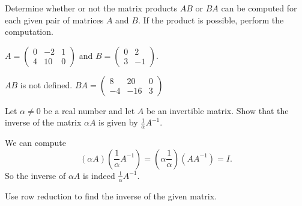 \documentclass{article}
\begin{document}



\problemlabel

\noindent Determine whether or  not the matrix products $AB$ or $BA$ can be computed for each given pair of  matrices $A$ and $B$.  If the product is possible, perform the computation.

\begin{exercise}  \label{c4.6.-1b}
$A=\left(\begin{array}{rrr} 0 & -2 & 1\\ 4 & 10 & 0 \end{array}\right)$
and $B=\left(\begin{array}{rr} 0 & 2 \\ 3 & -1 \end{array}\right)$.

\begin{solution}
$AB$ is not defined. $BA=\left(\begin{array}{rrr} 8 &  20 &  0\\
 -4 & -16  &  3\end{array}\right)$


\end{solution}
\end{exercise}





\problemlabel

\begin{exercise} \label{c4.8.2}
Let $\alpha \not=0$ be a real number and let $A$ be an invertible
matrix.  Show that the inverse of the matrix $\alpha A$ is given by
$\frac{1}{\alpha}A^{-1}$.

\begin{solution}

We can compute
\[ (\alpha A)\left(\frac{1}{\alpha}A^{-1}\right) =
\left(\alpha\frac{1}{\alpha}\right)(AA^{-1}) = I. \]
So the inverse of $\alpha A$ is indeed $\frac{1}{\alpha}A^{-1}$.

\end{solution}
\end{exercise}





\problemlabel

\noindent Use row reduction to find the inverse of the given matrix.
\end{document}
